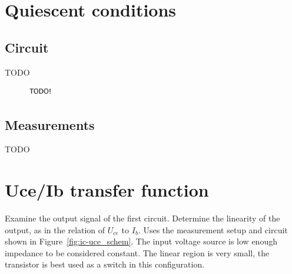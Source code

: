 \documentclass[11pt,a4paper]{article}
\begin{document}
\section{Quiescent conditions}\label{quiescent-conditions}

\subsection{Circuit}\label{circuit-1}

TODO

\begin{figure}[htbp]
    \centering
    \includegraphics[width=0.1\textwidth]{img/TODO.png}
    \caption{}
    \label{}
\end{figure}

\subsection{Measurements}\label{quiescent-conditions-measurements}

TODO


\section{Uce/Ib transfer function}\label{uceib-transfer-function}

Examine the output signal of the first circuit. Determine the linearity
of the output, as in the relation of $U_{ce}$ to $I_{b}$. Uses the measurement
setup and circuit shown in Figure~\ref{fig:ic-uce_schem}. The input voltage source is low
enough impedance to be considered constant. The linear region is very
small, the transistor is best used as a switch in this configuration.
\end{document}
